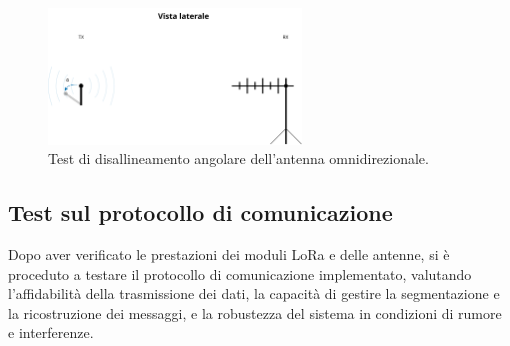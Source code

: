 \documentclass[12pt,a4paper,twoside]{book}
\begin{document}
\begin{figure}[H]
    \centering
    \includegraphics[width=0.6\textwidth]{img/tests/telemetry-test-omni.png}
    \caption{Test di disallineamento angolare dell'antenna omnidirezionale.}
    \label{fig:omnidirectional-test}
\end{figure}

\subsection{Test sul protocollo di comunicazione}
Dopo aver verificato le prestazioni dei moduli \ac{LoRa} e delle antenne, si è
proceduto a testare il protocollo di comunicazione implementato, valutando
l'affidabilità della trasmissione dei dati, la capacità di gestire la segmentazione
e la ricostruzione dei messaggi, e la robustezza del sistema in condizioni
di rumore e interferenze.
\end{document}
